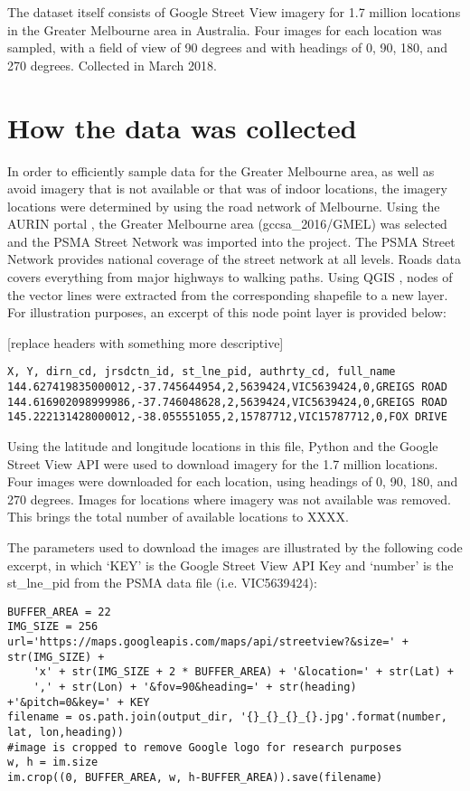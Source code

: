 \documentclass[final,3p,times,authoryear]{elsarticle}
\begin{document}
The dataset itself consists of Google Street View imagery for 1.7 million locations in the Greater Melbourne area in Australia. Four images for each location was sampled, with a field of view of 90 degrees and with headings of 0, 90, 180, and 270 degrees. Collected in March 2018.

\section{How the data was collected}\label{sec:create}
In order to efficiently sample data for the Greater Melbourne area, as well as avoid imagery that is not available or that was of indoor locations, the imagery locations were determined by using the road network of Melbourne. Using the AURIN portal \citep{Aurin2018}, the Greater Melbourne area (gccsa\_2016/GMEL) was selected and the PSMA Street Network \citep{PSMA2018} was imported into the project. The PSMA Street Network provides national coverage of the street network at all levels. Roads data covers everything from major highways to walking paths. Using QGIS \citep{QGIS2009}, nodes of the vector lines were extracted from the corresponding shapefile to a new layer. For illustration purposes, an excerpt of this node point layer is provided below:

[replace headers with something more descriptive]
\begin{verbatim}
X, Y, dirn_cd, jrsdctn_id, st_lne_pid, authrty_cd, full_name
144.627419835000012,-37.745644954,2,5639424,VIC5639424,0,GREIGS ROAD
144.616902098999986,-37.746048628,2,5639424,VIC5639424,0,GREIGS ROAD
145.222131428000012,-38.055551055,2,15787712,VIC15787712,0,FOX DRIVE
\end{verbatim}

Using the latitude and longitude locations in this file, Python and the Google Street View API \citep{GoogleMaps2017b} were used to download imagery for the 1.7 million locations. Four images were downloaded for each location, using headings of 0, 90, 180, and 270 degrees. Images for locations where imagery was not available was removed. This brings the total number of available locations to XXXX.

The parameters used to download the images are illustrated by the following code excerpt, in which `KEY' is the Google Street View API Key and `number' is the st\_lne\_pid from the PSMA data file (i.e. VIC5639424):

\begin{verbatim}
BUFFER_AREA = 22
IMG_SIZE = 256
url='https://maps.googleapis.com/maps/api/streetview?&size=' + str(IMG_SIZE) +
    'x' + str(IMG_SIZE + 2 * BUFFER_AREA) + '&location=' + str(Lat) +
    ',' + str(Lon) + '&fov=90&heading=' + str(heading) +'&pitch=0&key=' + KEY         
filename = os.path.join(output_dir, '{}_{}_{}_{}.jpg'.format(number, lat, lon,heading))
#image is cropped to remove Google logo for research purposes
w, h = im.size
im.crop((0, BUFFER_AREA, w, h-BUFFER_AREA)).save(filename)
\end{verbatim}
\end{document}
